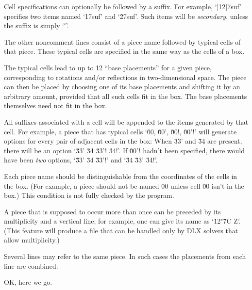 Cell specifications can optionally be followed by a suffix. For example,
`\.{[12]7suf}' specifies two items named `\.{17suf}' and `\.{27suf}'.
Such items will be {\it secondary}, unless the suffix is simply `\.''.

The other noncomment lines consist of a piece name followed by typical
cells of that piece. These typical cells are specified in the same way
as the cells of a box.

The typical cells lead to up to 12 ``base placements'' for a given piece,
corresponding to rotations and/or reflections in two-dimensional space.
The piece can then be placed by choosing one of its base placements and
shifting
it by an arbitrary amount, provided that all such cells fit in the box.
The base placements themselves need not fit in the box.

All suffixes associated with a cell will be appended to the items
generated by that cell. For example, a piece that has typical cells
`\.{00}, \.{00'}, \.{00!}, \.{00'!}' will generate options for every
pair of adjacent cells in the box: When \.{33'} and \.{34} are present,
there will be an option `\.{33'} \.{34} \.{33'!} \.{34!}'.
If \.{00'!} hadn't been specified, there
would have been {\it two\/} options, `\.{33'} \.{34} \.{33'!}' and
`\.{34} \.{33'} \.{34!}'.

Each piece name should be distinguishable from the coordinates of the cells
in the box. (For example, a piece should not be named \.{00} unless cell
\.{00} isn't in the box.) This condition is not fully checked by the program.

A piece that is supposed to occur more than once can be preceded by its
multiplicity and a vertical line; for example, one can give its name
as `\.{12\char"7C Z}'. (This feature will produce a file that can be handled
only by {\mc DLX} solvers that allow multiplicity.)

Several lines may refer to the same piece. In such cases the placements
from each line are combined.

\fi

OK, here we go.

